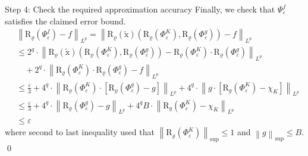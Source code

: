 \documentclass{if-beamer}
\newcommand{\norm}[2]{\left\lVert#1\right\rVert_{#2}}
\begin{document}
\begin{frame}{Step 4: Check the required approximation accuracy}
    Finally, we check that $\Psi_{\varepsilon}^{f}$ satisfies the claimed error bound.
    {\small
    \begin{align*}
        &\left\|\mathrm{R}_{\varrho}\left(\Psi_{\varepsilon}^{f}\right)-f\right\|_{L^{p}} =\left\|\mathrm{R}_{\varrho}(\widetilde{\mathrm{x}})\left(\mathrm{R}_{\varrho}\left(\Phi_{\varepsilon}^{K}\right), \mathrm{R}_{\varrho}\left(\Phi_{\varepsilon}^{g}\right)\right)-f\right\|_{L^{p}} \\
        & \leq 2^{q} \cdot\left\|\mathrm{R}_{\varrho}(\widetilde{\mathrm{x}})\left(\mathrm{R}_{\varrho}\left(\Phi_{\varepsilon}^{K}\right), \mathrm{R}_{\varrho}\left(\Phi_{\varepsilon}^{g}\right)\right)-\mathrm{R}_{\varrho}\left(\Phi_{\varepsilon}^{K}\right) \cdot \mathrm{R}_{\varrho}\left(\Phi_{\varepsilon}^{g}\right)\right\|_{L^{p}}\\
        & \quad+2^{q} \cdot\left\|\mathrm{R}_{\varrho}\left(\Phi_{\varepsilon}^{K}\right) \cdot \mathrm{R}_{\varrho}\left(\Phi_{\varepsilon}^{g}\right)-f\right\|_{L^{p}} \\
        & \leq \frac{\varepsilon}{3}+4^{q} \cdot\left\|\mathrm{R}_{\varrho}\left(\Phi_{\varepsilon}^{K}\right) \cdot\left[\mathrm{R}_{\varrho}\left(\Phi_{\varepsilon}^{g}\right)-g\right]\right\|_{L^{p}}+4^{q} \cdot\left\|g \cdot\left[\mathrm{R}_{g}\left(\Phi_{\varepsilon}^{K}\right)-\chi_{K}\right]\right\|_{L^{p}}\\
        &\leq \frac{\varepsilon}{3}+4^{q} \cdot\left\|\mathrm{R}_{\varrho}\left(\Phi_{\varepsilon}^{g}\right)-g\right\|_{L^{p}}+4^{q}B \cdot\left\|\mathrm{R}_{g}\left(\Phi_{\varepsilon}^{K}\right)-\chi_{K}\right\|_{L^{p}}\\
        &\leq \varepsilon
    \end{align*}
    }%
    where second to last inequality used that $\norm{\mathrm{R}_{\varrho}\left(\Phi_{\varepsilon}^{K}\right)}{\sup} \leq 1$ and $\norm{g}{\sup}\leq B$. \qed
\end{frame}
\end{document}
